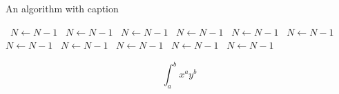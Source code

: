 \documentclass[a4paper]{article}
\begin{document}
\begin{algorithm}
\caption{An algorithm with caption}
\begin{algorithmic}
\    \State $N \gets N - 1$
\    \State $N \gets N - 1$
\    \State $N \gets N - 1$
\    \State $N \gets N - 1$
\    \State $N \gets N - 1$
\    \State $N \gets N - 1$
\    \State $N \gets N - 1$
\    \State $N \gets N - 1$
\    \State $N \gets N - 1$
\    \State $N \gets N - 1$
\    \State $N \gets N - 1$
\EndWhile
\end{algorithmic}
\end{algorithm}

\[ \int_{a}^{b}{x^{a}y^{b}} \]
\end{document}
